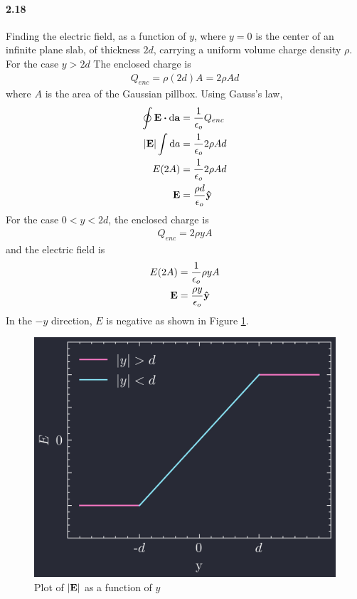 \documentclass[../main.tex]{subfiles}
\begin{document}
\paragraph{2.18}
Finding the electric field, as a function of $y$, where $y=0$ is the center of an infinite plane
slab, of thickness $2d$, carrying a uniform volume charge density $\rho$. For the case \(y > 2d\)
The enclosed charge is
\begin{align*}
    Q_{enc} = \rho (2d) A = 2\rho Ad
\end{align*}
where $A$ is the area of the Gaussian pillbox. Using Gauss's law,
\begin{align*}
    \oint \vb{E} \vdot \dd{\vb{a}} &= \frac{1}{\epsilon_o} Q_{enc} \\
    \abs{\vb{E}} \int \dd{a} &= \frac{1}{\epsilon_o} 2\rho Ad \\
    E (2A) &= \frac{1}{\epsilon_o} 2\rho Ad \\
    \vb{E} &= \frac{\rho d}{\epsilon_o} \vu{y}
\end{align*}
For the case \(0 < y < 2d\), the enclosed charge is
\begin{align*}
    Q_{enc} = 2\rho y A
\end{align*}
and the electric field is
\begin{align*}
    E (2A) &= \frac{1}{\epsilon_o} \rho y A \\
    \vb{E} &= \frac{\rho y}{\epsilon_o} \vu{y}
\end{align*}
In the $-y$ direction, $E$ is negative as shown in Figure \ref{fig:2_17}.
\begin{figure}[ht]
    \centering
    \includegraphics[width=0.8\linewidth]{images/hw2_17.png}
    \captionsetup{width=0.8\linewidth}
    \caption{Plot of $\abs{\vb{E}}$ as a function of $y$}
    \label{fig:2_17}
\end{figure}
\end{document}
